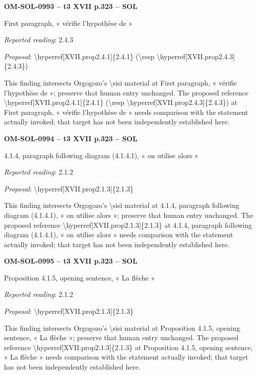 \par\noindent\textbf{OM-SOL-0993 -- t3 XVII p.323 -- SOL}\par
First paragraph, « vérifie l'hypothèse de »\par
\emph{Reported reading}: 2.4.3\par
\emph{Proposal}: \textbackslash{}hyperref[XVII.prop2.4.1]\{2.4.1\} (\textbackslash{}resp \textbackslash{}hyperref[XVII.prop2.4.3]\{2.4.3\})\par
This finding intersects Orgogozo's \textbackslash{}sisi material at First paragraph, « vérifie l'hypothèse de »; preserve that human entry unchanged. The proposed reference \textbackslash{}hyperref[XVII.prop2.4.1]\{2.4.1\} (\textbackslash{}resp \textbackslash{}hyperref[XVII.prop2.4.3]\{2.4.3\}) at First paragraph, « vérifie l'hypothèse de » needs comparison with the statement actually invoked; that target has not been independently established here.\par
\par\noindent\textbf{OM-SOL-0994 -- t3 XVII p.323 -- SOL}\par
4.1.4, paragraph following diagram (4.1.4.1), « on utilise alors »\par
\emph{Reported reading}: 2.1.2\par
\emph{Proposal}: \textbackslash{}hyperref[XVII.prop2.1.3]\{2.1.3\}\par
This finding intersects Orgogozo's \textbackslash{}sisi material at 4.1.4, paragraph following diagram (4.1.4.1), « on utilise alors »; preserve that human entry unchanged. The proposed reference \textbackslash{}hyperref[XVII.prop2.1.3]\{2.1.3\} at 4.1.4, paragraph following diagram (4.1.4.1), « on utilise alors » needs comparison with the statement actually invoked; that target has not been independently established here.\par
\par\noindent\textbf{OM-SOL-0995 -- t3 XVII p.323 -- SOL}\par
Proposition 4.1.5, opening sentence, « La flèche »\par
\emph{Reported reading}: 2.1.2\par
\emph{Proposal}: \textbackslash{}hyperref[XVII.prop2.1.3]\{2.1.3\}\par
This finding intersects Orgogozo's \textbackslash{}sisi material at Proposition 4.1.5, opening sentence, « La flèche »; preserve that human entry unchanged. The proposed reference \textbackslash{}hyperref[XVII.prop2.1.3]\{2.1.3\} at Proposition 4.1.5, opening sentence, « La flèche » needs comparison with the statement actually invoked; that target has not been independently established here.\par

